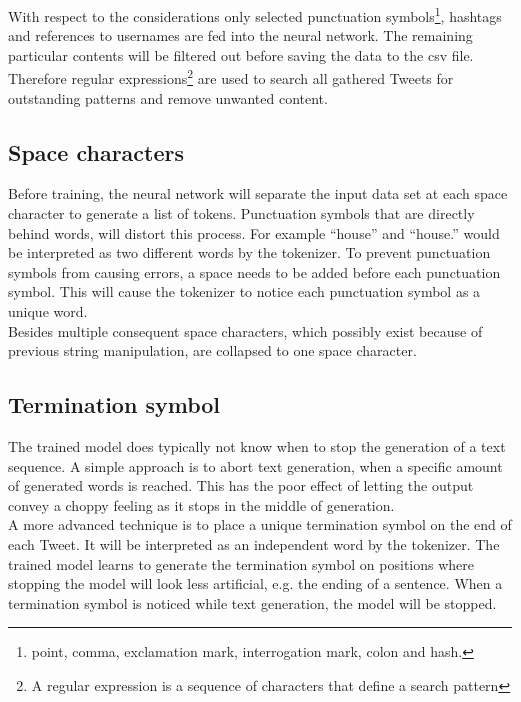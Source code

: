 \documentclass[conference]{IEEEtran}
\begin{document}
With respect to the considerations only selected punctuation symbols\footnote{point, comma, exclamation mark, interrogation mark, colon and hash.},  hashtags and references to usernames are fed into the neural network. The remaining particular contents will be filtered out before saving the data to the csv file. Therefore regular expressions\footnote{A regular expression is a sequence of characters that define a search pattern} are used to search all gathered Tweets for outstanding patterns and remove unwanted content.

\subsection{Space characters}\label{subsec_space_characters}

Before training, the neural network will separate the input data set at each space character to generate a list of tokens. Punctuation symbols that are directly behind words, will distort this process. For example ``house'' and ``house.'' would be interpreted as two different words by the tokenizer. To prevent punctuation symbols from causing errors, a space needs to be added before each punctuation symbol. This will cause the tokenizer to notice each punctuation symbol as a unique word.\\
Besides multiple consequent space characters, which possibly exist because of previous string manipulation, are collapsed to one space character.

\subsection{Termination symbol}\label{subsec_termination_symbol}

The trained model does typically not know when to stop the generation of a text sequence. A simple approach is to abort text generation, when a specific amount of generated words is reached. This has the poor effect of letting the output convey a choppy feeling as it stops in the middle of generation.\\
A more advanced technique is to place a unique termination symbol on the end of each Tweet. It will be interpreted as an independent word by the tokenizer. The trained model learns to generate the termination symbol on positions where stopping the model will look less artificial, e.g. the ending of a sentence. When a termination symbol is noticed while text generation, the model will be stopped.
\end{document}
